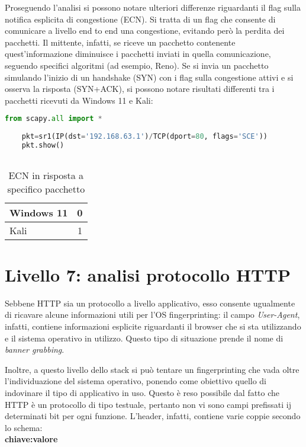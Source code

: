 Proseguendo l'analisi si possono notare ulteriori differenze riguardanti il flag sulla notifica esplicita di congestione (ECN). Si tratta di un flag che consente di comunicare a livello end to end una congestione, evitando però la perdita dei pacchetti. Il mittente, infatti, se riceve un pacchetto contenente quest'informazione diminuisce i pacchetti inviati in quella comunicazione, seguendo specifici algoritmi (ad esempio, Reno). 
Se si invia un pacchetto simulando l'inizio di un handshake (SYN) con i flag sulla congestione attivi e si osserva la risposta (SYN+ACK), si possono notare risultati differenti tra i pacchetti ricevuti da Windows 11 e Kali:
\\
\begin{lstlisting}[language=Python, caption={Comando Python per l'invio del pacchetto}]
	from scapy.all import *
	
	pkt=sr1(IP(dst='192.168.63.1')/TCP(dport=80, flags='SCE'))
	pkt.show()
	
\end{lstlisting}

\begin{table}[h]
	\centering
	\begin{tabular}{| l | c |}
		\hline
		\rowcolor{blue!10} Windows 11 & 0
		\\
		\hline
		\rowcolor{red!10} Kali & 1
		\\
		\hline
		
	\end{tabular}
	\caption{ECN in risposta a specifico pacchetto}
	\label{tab:ECN}
\end{table}


\section{Livello 7: analisi protocollo HTTP}
Sebbene HTTP sia un protocollo a livello applicativo, esso consente ugualmente di ricavare alcune informazioni utili per l'OS fingerprinting: il campo \textit{User-Agent}, infatti, contiene informazioni esplicite riguardanti il browser che si sta utilizzando e il sistema operativo in utilizzo. Questo tipo di situazione prende il nome di \textit{banner grabbing}.

Inoltre, a questo livello dello stack si può tentare un fingerprinting che vada oltre l'individuazione del sistema operativo, ponendo come obiettivo quello di indovinare il tipo di applicativo in uso.
Questo è reso possibile dal fatto che HTTP è un protocollo di tipo testuale, pertanto non vi sono campi prefissati ij determinati bit per ogni funzione.
L'header, infatti, contiene varie coppie secondo lo schema:\\
\textbf{chiave:valore} 


